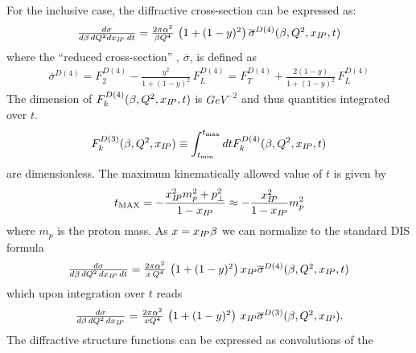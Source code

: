 For the inclusive case, the diffractive cross-section can be expressed as:
\begin{equation}
\begin{array}{lcl}
  \frac{d\sigma}{d\beta\,dQ^2dx_{{I\!P}}\,dt}
=
  \frac{2\pi\alpha^2}{\beta Q^4}\,
    \left( 1 +  (1-y)^2 \right) \overline\sigma^{D(4)}(\beta,Q^2,x_{{I\!P}},t)
\label{Dxs}
\end{array}
\end{equation}
where the ``reduced cross-section'' , $\overline\sigma$, is defined as
\begin{equation}
\begin{array}{lcl}
\overline\sigma^{D(4)}
 = F_2^{D(4)} - \frac{y^2}{1 +  (1-y)^2}\, F_L^{D(4)}
 = F_T^{D(4)} + \frac{2(1-y)}{1 +  (1-y)^2}\, F_L^{D(4)}
\label{eq:sigred}
\end{array}
\end{equation}
The dimension of $F_k^{D(4)}(\beta,Q^2,x_{{I\!P}},t)$
is $GeV^{-2}$ and thus quantities integrated over $t$.
\begin{equation}
F_k^{D(3)}(\beta,Q^2,x_{{I\!P}})
\equiv
\int_{t_{\rm min}}^{t_{\rm max}} dt
F_k^{D(4)}(\beta,Q^2,x_{{I\!P}},t)
\end{equation}
are dimensionless. The maximum kinematically allowed value of $t$ is given by
\begin{equation}
t_{\rm MAX} 
=
-\frac{x_{{I\!P}}^2 m_p^2 + p_\perp^2}{1-x_{{I\!P}}}
\approx 
-\frac{x_{{I\!P}}^2}{1-x_{{I\!P}}} m_p^2
\end{equation}
where $m_p$ is the proton mass.
As $x = x_{{I\!P}}\beta$ we can normalize to the standard DIS formula
\begin{equation}
\begin{array}{lcl}
\frac{d\sigma}{d\beta\,dQ^2\,dx_{{I\!P}}\,dt} =
  \frac{2\pi\alpha^2}{x\, Q^4}\,
    \left( 1 +  (1-y)^2 \right) x_{{I\!P}}\overline\sigma^{D(4)}(\beta,Q^2,x_{{I\!P}},t)
\end{array}
\end{equation}
which upon integration over $t$ reads
\begin{equation}
\begin{array}{lcl}
\label{Dxs3}
  \frac{d\sigma}{d\beta\,dQ^2\,dx_{{I\!P}}}
=  
  \frac{2\pi\alpha^2}{x Q^4}\,
    \left( 1 +  (1-y)^2 \right) \,x_{{I\!P}}\overline\sigma^{D(3)}(\beta,Q^2,x_{{I\!P}}).
\end{array}
\end{equation}
The diffractive structure functions can be expressed as convolutions of the
